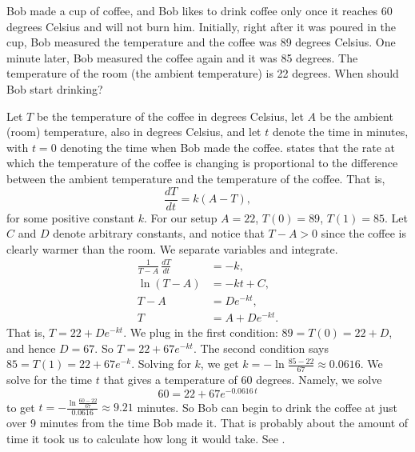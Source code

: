\begin{example} \label{sep:coffeeexample}
Bob made a cup of coffee, and
Bob likes to drink coffee only once it reaches 60 degrees Celsius and will not burn him.
Initially, right after it was poured in the cup,
Bob measured the temperature and the coffee was 89 degrees Celsius.
One minute later, Bob measured the coffee again and it was 85 degrees.
The temperature of the room (the ambient temperature) is 22 degrees.
When should Bob start drinking?

Let $T$ be the temperature of the coffee in degrees Celsius, let $A$ be
the ambient (room) temperature, also in degrees Celsius,
and let $t$ denote the time in minutes, with $t=0$ denoting the time
when Bob made the coffee.
 states that the rate at which the
temperature of the coffee is changing
is proportional to the difference between the
ambient temperature and the temperature of the coffee.  That is,
\begin{equation*}
\frac{dT}{dt} = k(A-T) ,
\end{equation*}
for some positive constant $k$.
For our setup $A=22$, $T(0) = 89$, $T(1) = 85$.
Let $C$ and $D$ denote arbitrary
constants, and notice that $T - A > 0$ since the coffee is clearly warmer
than the room.
We separate variables and integrate.
\begin{align*}
\frac{1}{T-A} \, \frac{dT}{dt} & = -k , \\
\ln (T-A) &= -kt + C , \\ %
T-A &= D e^{-kt} ,  \\
T &= A + D e^{-kt} .
\end{align*}
That is,
$T = 22 + D e^{-kt}$.  We plug in the first condition: $89 = T(0) = 22 +
D$,
and hence $D = 67$.  So
$T = 22 + 67 e^{-kt}$.  The second condition says $85 = T(1) =
22 + 67 e^{-k}$.  Solving for $k$, we get
$k = - \ln \frac{85-22}{67} \approx 0.0616$.  We solve for the time $t$
that gives a temperature of 60 degrees.  Namely, we solve
\begin{equation*}
60 = 22 + 67 e^{-0.0616\,t}
\end{equation*}
to get
$t = - \frac{\ln \frac{60-22}{67}}{0.0616} \approx 9.21$ minutes.  So Bob can
begin to drink the coffee at just over 9 minutes from the time Bob made
it.  That is probably about the amount of time it took us to calculate how long
it would take.  See .
\begin{myfig}

\end{myfig}
\end{example}

